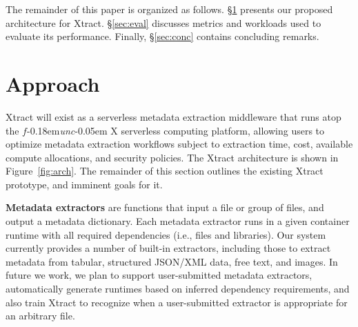 \documentclass[sigconf, 9pt]{acmart}
\newcommand{\name}{Xtract}
\newcommand{\funcx}{$f$\kern-0.18em\emph{unc}\kern-0.05em X}
\begin{document}
The remainder of this paper is organized as follows. 
\S\ref{sec:approach} presents our proposed architecture for \name{}. 
\S\ref{sec:eval} discusses metrics and workloads used to evaluate its performance. 
Finally, \S\ref{sec:conc} contains concluding remarks.


\section{Approach}
\label{sec:approach}

\name{} will exist as a serverless metadata extraction middleware that runs atop the \funcx{} serverless 
computing platform, allowing users to optimize metadata extraction workflows subject to 
extraction time, cost, available compute allocations, and security policies.
The \name{} architecture is shown in Figure~\ref{fig:arch}.
The remainder 
of this section outlines the existing \name{} prototype, and imminent goals for it. 

\textbf{Metadata extractors} are functions that input a file or group of files, and output a metadata dictionary. 
Each metadata extractor runs in a given container runtime with all required dependencies (i.e., files and 
libraries).  Our system currently provides a number of built-in extractors, including
those to extract metadata from tabular, structured JSON/XML data, free text, and images. In future we work, 
we plan to support user-submitted metadata extractors, automatically generate runtimes based on inferred 
dependency requirements, and also train \name{} to recognize when a user-submitted extractor 
is appropriate for an arbitrary file. 
\end{document}
